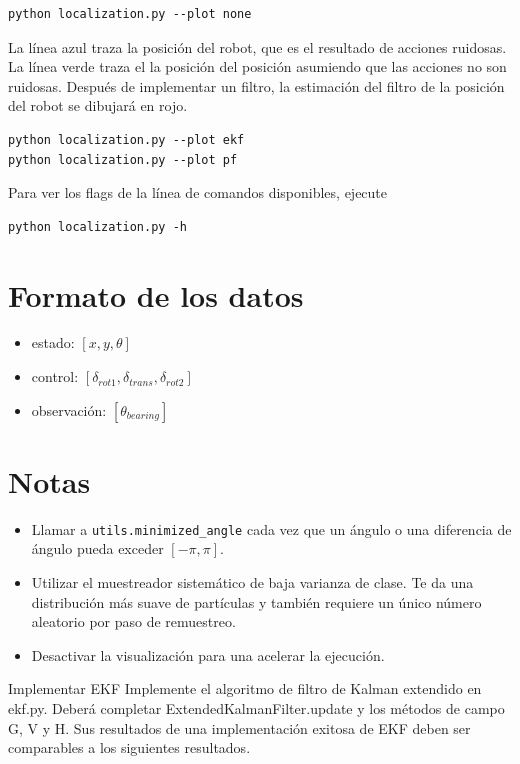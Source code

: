 \documentclass[tp]{lcc}
\begin{document}
\begin{lstlisting}[style=bash] 
python localization.py --plot none
\end{lstlisting}


	La línea azul traza la posición del robot, que es el resultado de acciones ruidosas. La línea verde traza el la posición del posición asumiendo que las acciones no son ruidosas. Después de implementar un filtro, la estimación del filtro de la posición del robot se dibujará en rojo.
	
	
\begin{lstlisting}[style=bash] 
python localization.py --plot ekf
python localization.py --plot pf
\end{lstlisting}

	Para ver los flags de la línea de comandos disponibles, ejecute

\begin{lstlisting}[style=bash] 
python localization.py -h
\end{lstlisting}

	\section{Formato de los datos}

	\begin{itemize}
		\item estado: $[x,y,\theta]$
		\item control: $[\delta_{rot1},\delta_{trans},\delta_{rot2}]$
		\item observación: $[\theta_{bearing}]$
	\end{itemize}
	
	\section{Notas}
	\begin{itemize}
		\item Llamar a \lstinline[style=bash]{utils.minimized_angle} cada vez que un ángulo o una diferencia de ángulo pueda exceder $[-\pi, \pi]$.
		\item Utilizar el muestreador sistemático de baja varianza de clase. Te da una distribución más suave de partículas y también requiere un único número aleatorio por paso de remuestreo.
		\item Desactivar la visualización para una acelerar la ejecución.
	\end{itemize}

	\ejercicio Implementar EKF
	Implemente el algoritmo de filtro de Kalman extendido en ekf.py. Deberá completar ExtendedKalmanFilter.update
	y los métodos de campo G, V y H. Sus resultados de una implementación exitosa de EKF deben ser comparables
	a los siguientes resultados.
\end{document}

